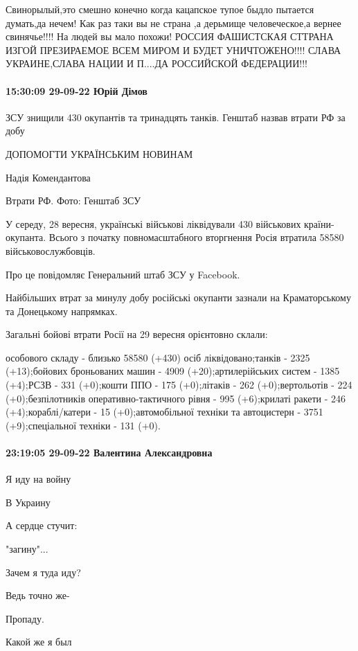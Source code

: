Свинорылый,это смешно конечно когда кацапское тупое быдло пытается думать,да
нечем! Как раз таки вы не страна ,а дерьмище человеческое,а вернее свинячье!!!!
На людей вы мало похожи! РОССИЯ ФАШИСТСКАЯ СТТРАНА ИЗГОЙ ПРЕЗИРАЕМОЕ ВСЕМ МИРОМ
И БУДЕТ УНИЧТОЖЕНО!!!! СЛАВА УКРАИНЕ,СЛАВА НАЦИИ И П....ДА РОССИЙСКОЙ
ФЕДЕРАЦИИ!!!

\paragraph{15:30:09 29-09-22 Юрій Дімов}

ЗСУ знищили 430 окупантів та тринадцять танків. Генштаб назвав втрати РФ за добу

ДОПОМОГТИ УКРАЇНСЬКИМ НОВИНАМ

Надія Комендантова

Втрати РФ. Фото: Генштаб ЗСУ

У середу, 28 вересня, українські військові ліквідували 430 військових
країни-окупанта. Всього з початку повномасштабного вторгнення Росія втратила
58580 військовослужбовців.

Про це повідомляє Генеральний штаб ЗСУ у Facebook.

Найбільших втрат за минулу добу російські окупанти зазнали на Краматорському та
Донецькому напрямках.

Загальні бойові втрати Росії на 29 вересня орієнтовно склали:

особового складу - близько 58580 (+430) осіб ліквідовано;танків - 2325
(+13);бойових броньованих машин - 4909 (+20);артилерійських систем - 1385
(+4);РСЗВ - 331 (+0);кошти ППО - 175 (+0);літаків - 262 (+0);вертольотів - 224
(+0);безпілотників оперативно-тактичного рівня - 995 (+6);крилаті ракети - 246
(+4);кораблі/катери - 15 (+0);автомобільної техніки та автоцистерн - 3751
(+9);спеціальної техніки - 131 (+0).

\paragraph{23:19:05 29-09-22 Валентина Александровна}

Я иду на войну

В Украину

А сердце стучит:

"загину"...

Зачем я туда иду?

Ведь точно же-

Пропаду.


Какой же я был

